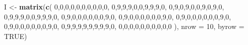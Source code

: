 \documentclass[
]{book}
\newenvironment{Shaded}{\begin{snugshade}}{\end{snugshade}}
\newcommand{\AttributeTok}[1]{\textcolor[rgb]{0.13,0.29,0.53}{#1}}
\newcommand{\ConstantTok}[1]{\textcolor[rgb]{0.56,0.35,0.01}{#1}}
\newcommand{\DecValTok}[1]{\textcolor[rgb]{0.00,0.00,0.81}{#1}}
\newcommand{\FunctionTok}[1]{\textcolor[rgb]{0.13,0.29,0.53}{\textbf{#1}}}
\newcommand{\NormalTok}[1]{#1}
\newcommand{\OtherTok}[1]{\textcolor[rgb]{0.56,0.35,0.01}{#1}}
\begin{document}
\begin{Shaded}
\begin{Highlighting}[]
\NormalTok{I }\OtherTok{\textless{}{-}} \FunctionTok{matrix}\NormalTok{(}\FunctionTok{c}\NormalTok{(}
  \DecValTok{0}\NormalTok{,}\DecValTok{0}\NormalTok{,}\DecValTok{0}\NormalTok{,}\DecValTok{0}\NormalTok{,}\DecValTok{0}\NormalTok{,}\DecValTok{0}\NormalTok{,}\DecValTok{0}\NormalTok{,}\DecValTok{0}\NormalTok{,}\DecValTok{0}\NormalTok{,}\DecValTok{0}\NormalTok{,}
  \DecValTok{0}\NormalTok{,}\DecValTok{9}\NormalTok{,}\DecValTok{9}\NormalTok{,}\DecValTok{9}\NormalTok{,}\DecValTok{0}\NormalTok{,}\DecValTok{0}\NormalTok{,}\DecValTok{9}\NormalTok{,}\DecValTok{9}\NormalTok{,}\DecValTok{9}\NormalTok{,}\DecValTok{0}\NormalTok{,}
  \DecValTok{0}\NormalTok{,}\DecValTok{9}\NormalTok{,}\DecValTok{0}\NormalTok{,}\DecValTok{9}\NormalTok{,}\DecValTok{0}\NormalTok{,}\DecValTok{0}\NormalTok{,}\DecValTok{9}\NormalTok{,}\DecValTok{0}\NormalTok{,}\DecValTok{9}\NormalTok{,}\DecValTok{0}\NormalTok{,}
  \DecValTok{0}\NormalTok{,}\DecValTok{9}\NormalTok{,}\DecValTok{9}\NormalTok{,}\DecValTok{9}\NormalTok{,}\DecValTok{0}\NormalTok{,}\DecValTok{0}\NormalTok{,}\DecValTok{9}\NormalTok{,}\DecValTok{9}\NormalTok{,}\DecValTok{9}\NormalTok{,}\DecValTok{0}\NormalTok{,}
  \DecValTok{0}\NormalTok{,}\DecValTok{9}\NormalTok{,}\DecValTok{0}\NormalTok{,}\DecValTok{0}\NormalTok{,}\DecValTok{0}\NormalTok{,}\DecValTok{0}\NormalTok{,}\DecValTok{0}\NormalTok{,}\DecValTok{0}\NormalTok{,}\DecValTok{9}\NormalTok{,}\DecValTok{0}\NormalTok{,}
  \DecValTok{0}\NormalTok{,}\DecValTok{9}\NormalTok{,}\DecValTok{0}\NormalTok{,}\DecValTok{0}\NormalTok{,}\DecValTok{0}\NormalTok{,}\DecValTok{0}\NormalTok{,}\DecValTok{0}\NormalTok{,}\DecValTok{0}\NormalTok{,}\DecValTok{9}\NormalTok{,}\DecValTok{0}\NormalTok{,}
  \DecValTok{0}\NormalTok{,}\DecValTok{9}\NormalTok{,}\DecValTok{0}\NormalTok{,}\DecValTok{0}\NormalTok{,}\DecValTok{0}\NormalTok{,}\DecValTok{0}\NormalTok{,}\DecValTok{0}\NormalTok{,}\DecValTok{0}\NormalTok{,}\DecValTok{9}\NormalTok{,}\DecValTok{0}\NormalTok{,}
  \DecValTok{0}\NormalTok{,}\DecValTok{9}\NormalTok{,}\DecValTok{0}\NormalTok{,}\DecValTok{0}\NormalTok{,}\DecValTok{0}\NormalTok{,}\DecValTok{0}\NormalTok{,}\DecValTok{0}\NormalTok{,}\DecValTok{0}\NormalTok{,}\DecValTok{9}\NormalTok{,}\DecValTok{0}\NormalTok{,}
  \DecValTok{0}\NormalTok{,}\DecValTok{9}\NormalTok{,}\DecValTok{9}\NormalTok{,}\DecValTok{9}\NormalTok{,}\DecValTok{9}\NormalTok{,}\DecValTok{9}\NormalTok{,}\DecValTok{9}\NormalTok{,}\DecValTok{9}\NormalTok{,}\DecValTok{9}\NormalTok{,}\DecValTok{0}\NormalTok{,}
  \DecValTok{0}\NormalTok{,}\DecValTok{0}\NormalTok{,}\DecValTok{0}\NormalTok{,}\DecValTok{0}\NormalTok{,}\DecValTok{0}\NormalTok{,}\DecValTok{0}\NormalTok{,}\DecValTok{0}\NormalTok{,}\DecValTok{0}\NormalTok{,}\DecValTok{0}\NormalTok{,}\DecValTok{0}
\NormalTok{), }\AttributeTok{nrow =} \DecValTok{10}\NormalTok{, }\AttributeTok{byrow =} \ConstantTok{TRUE}\NormalTok{)}
\end{Highlighting}
\end{Shaded}
\end{document}
